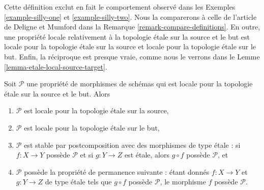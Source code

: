 \noindent
Cette définition exclut en fait le comportement observé dans les
Exemples \ref{example-silly-one} et \ref{example-silly-two}.
Nous la comparerons à celle de l'article \cite{DM} de Deligne et Mumford dans
la Remarque \ref{remark-compare-definitions}.
En outre, une propriété locale relativement à la topologie \'etale sur la
source et le but est locale pour la topologie \'etale sur la source et locale
pour la topologie \'etale sur le but.
Enfin, la réciproque est presque vraie, comme nous le verrons dans le
Lemme \ref{lemma-etale-local-source-target}.

\begin{lemma}
\label{lemma-local-source-target-implies}
Soit $\mathcal{P}$ une propriété de morphismes de schémas qui est locale pour
la topologie \'etale sur la source et le but. Alors
\begin{enumerate}
\item $\mathcal{P}$ est locale pour la topologie \'etale sur la source,
\item $\mathcal{P}$ est locale pour la topologie \'etale sur le but,
\item $\mathcal{P}$ est stable par postcomposition avec des morphismes de type
\'etale : si $f : X \to Y$ possède $\mathcal{P}$ et si $g : Y \to Z$ est
\'etale, alors $g \circ f$ possède $\mathcal{P}$, et
\item $\mathcal{P}$ possède la propriété de permanence suivante : étant donnés
$f : X \to Y$ et $g : Y \to Z$ de type \'etale tels que $g \circ f$ possède
$\mathcal{P}$, le morphisme $f$ possède $\mathcal{P}$.
\end{enumerate}
\end{lemma}

